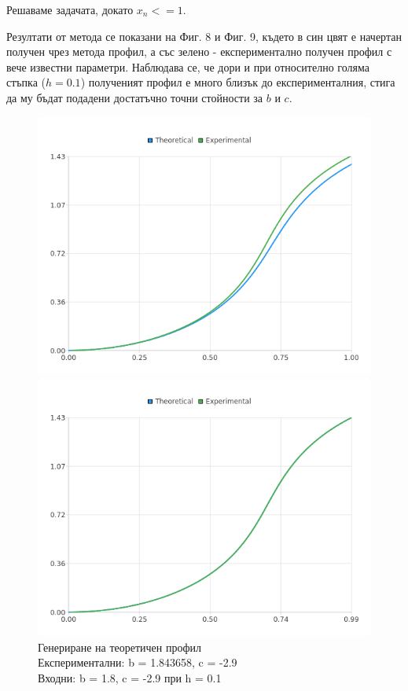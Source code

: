 \documentclass{article}
\begin{document}
Решаваме задачата, докато $x_n <= 1$.

Резултати от метода се показани на Фиг. 8 и Фиг. 9, където в син цвят е начертан получен чрез метода профил, а със зелено - експериментално получен профил с вече известни параметри. Наблюдава се, че дори и при относително голяма стъпка ($h = 0.1$) полученият профил е много близък до експерименталния, стига да му бъдат подадени достатъчно точни стойности за \(b\) и \(c\).

\begin{figure}[H]
\centering
\begin{minipage}{0.5\textwidth}
  \centering
  \includegraphics[width=1\linewidth]{app-theoretical-1.png}
  \caption{Генериране на теоретичен профил \protect\\ Експериментални: b = 1.843658, c = -2.9 \protect\\ Входни: b = 1.8, c = -2.9 при h = 0.1}
\end{minipage}%
\begin{minipage}{0.5\textwidth}
  \centering
  \includegraphics[width=1\linewidth]{app-theoretical-2.png}

\end{minipage}
\end{figure}
\end{document}
